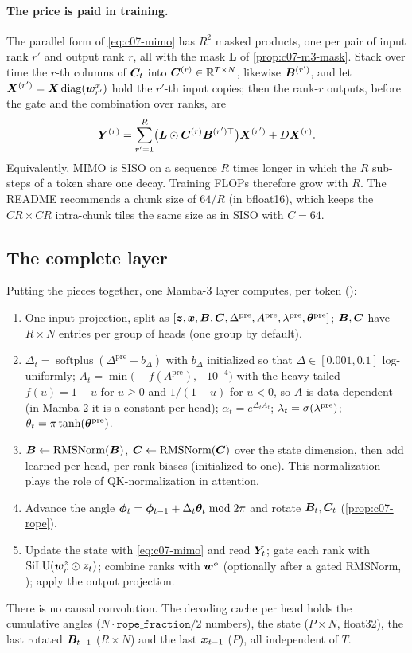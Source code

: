 \paragraph{The price is paid in training.} The parallel form of \cref{eq:c07-mimo} has $R^2$
masked products, one per pair of input rank $r'$ and output rank $r$, all with the mask $\bm{L}$ of
\cref{prop:c07-m3-mask}. Stack over time the $r$-th columns of $\bm{C}_t$ into
$\bm{C}^{(r)}\in\mathbb{R}^{T\times N}$, likewise $\bm{B}^{(r')}$, and let $\bm{X}^{(r')} = \bm{X}\operatorname{diag}(\bm{w}^x_{r'})$ hold the
$r'$-th input copies; then the rank-$r$ outputs, before the gate and the combination over ranks, are
\[
  \bm{Y}^{(r)} = \sum_{r'=1}^{R}\bigl(\bm{L}\odot\bm{C}^{(r)}\bm{B}^{(r')\top}\bigr)\bm{X}^{(r')} + D\bm{X}^{(r)} .
\]
Equivalently, MIMO is SISO on a sequence $R$ times longer in which the $R$ sub-steps of a
token share one decay. Training FLOPs therefore grow with $R$. The README recommends a chunk
size of $64/R$ (in bfloat16), which keeps the $CR\times CR$ intra-chunk tiles the same size as
in SISO with $C=64$.

\subsection{The complete layer}\label{sec:c07-m3-layer}

Putting the pieces together, one Mamba-3 layer computes, per token ():
\begin{enumerate}
\item One input projection, split as $[\bm{z}, \bm{x}, \bm{B}, \bm{C}, \Delta^{\mathrm{pre}}, A^{\mathrm{pre}}, \lambda^{\mathrm{pre}}, \bm{\theta}^{\mathrm{pre}}]$;
  $\bm{B},\bm{C}$ have $R\times N$ entries per group of heads (one group by default).
\item $\Delta_t = \operatorname{softplus}(\Delta^{\mathrm{pre}}+b_\Delta)$ with $b_\Delta$ initialized so that
  $\Delta\in[0.001, 0.1]$ log-uniformly;
  $A_t = \min\bigl(-f(A^{\mathrm{pre}}), -10^{-4}\bigr)$ with the heavy-tailed
  $f(u) = 1+u$ for $u\ge0$ and $1/(1-u)$ for $u<0$, so $A$ is data-dependent (in Mamba-2 it is
  a constant per head); $\alpha_t = e^{\Delta_tA_t}$; $\lambda_t = \sigma(\lambda^{\mathrm{pre}})$;
  $\theta_t = \pi\tanh(\bm{\theta}^{\mathrm{pre}})$.
\item $\bm{B}\gets\operatorname{RMSNorm}(\bm{B})$, $\bm{C}\gets\operatorname{RMSNorm}(\bm{C})$ over the state dimension, then add learned
  per-head, per-rank biases (initialized to one). This normalization plays the role of
  QK-normalization in attention.
\item Advance the angle $\bm{\phi}_t = \bm{\phi}_{t-1} + \Delta_t\bm{\theta}_t \bmod 2\pi$ and rotate
  $\bm{B}_t,\bm{C}_t$ (\cref{prop:c07-rope}).
\item Update the state with \cref{eq:c07-mimo} and read $\bm{Y}_t$; gate each rank with
  $\operatorname{SiLU}(\bm{w}^z_r\odot\bm{z}_t)$; combine ranks with $\bm{w}^o$ (optionally after a gated RMSNorm,
  ); apply the output projection.
\end{enumerate}
There is no causal convolution. The decoding cache per head holds the cumulative angles
($N\cdot\mathtt{rope\_fraction}/2$ numbers), the state ($P\times N$, float32), the last rotated
$\bm{B}_{t-1}$ ($R\times N$) and the last $\bm{x}_{t-1}$ ($P$), all independent of $T$.

